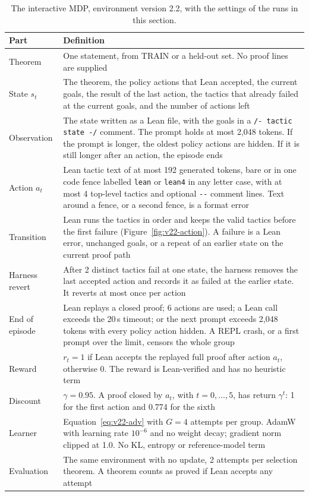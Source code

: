 \documentclass[11pt]{article}
\newcommand{\code}[1]{\texttt{#1}}
\begin{document}
\begin{table}[!htbp]
\centering
\small
\caption{The interactive MDP, environment version 2.2, with the settings of the runs in this section.}
\label{tab:mdp-v22}
\begin{tabularx}{\textwidth}{@{}P{2.6cm}Y@{}}
\toprule
Part & Definition \\
\midrule
Theorem & One statement, from TRAIN or a held-out set. No proof lines are supplied \\
State $s_t$ & The theorem, the policy actions that Lean accepted, the current goals, the result of the last action, the tactics that already failed at the current goals, and the number of actions left \\
Observation & The state written as a Lean file, with the goals in a \code{/- tactic state -/} comment. The prompt holds at most 2,048 tokens. If the prompt is longer, the oldest policy actions are hidden. If it is still longer after an action, the episode ends \\
Action $a_t$ & Lean tactic text of at most 192 generated tokens, bare or in one code fence labelled \code{lean} or \code{lean4} in any letter case, with at most 4 top-level tactics and optional \code{-{}-} comment lines. Text around a fence, or a second fence, is a format error \\
Transition & Lean runs the tactics in order and keeps the valid tactics before the first failure (Figure~\ref{fig:v22-action}). A failure is a Lean error, unchanged goals, or a repeat of an earlier state on the current proof path \\
Harness revert & After 2 distinct tactics fail at one state, the harness removes the last accepted action and records it as failed at the earlier state. It reverts at most once per action \\
End of episode & Lean replays a closed proof; 6 actions are used; a Lean call exceeds the 20\,s timeout; or the next prompt exceeds 2,048 tokens with every policy action hidden. A REPL crash, or a first prompt over the limit, censors the whole group \\
Reward & $r_t = 1$ if Lean accepts the replayed full proof after action $a_t$, otherwise 0. The reward is Lean-verified and has no heuristic term \\
Discount & $\gamma = 0.95$. A proof closed by $a_t$, with $t = 0, \dots, 5$, has return $\gamma^t$: 1 for the first action and 0.774 for the sixth \\
Learner & Equation~\eqref{eq:v22-adv} with $G = 4$ attempts per group. AdamW with learning rate $10^{-6}$ and no weight decay; gradient norm clipped at 1.0. No KL, entropy or reference-model term \\
Evaluation & The same environment with no update, 2 attempts per selection theorem. A theorem counts as proved if Lean accepts any attempt \\
\bottomrule
\end{tabularx}
\end{table}
\end{document}
